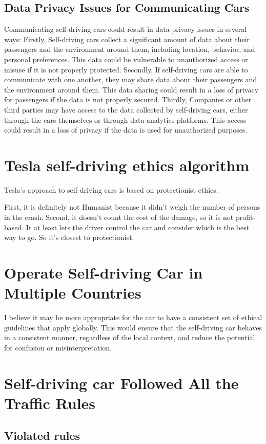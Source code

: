 \documentclass[
	letterpaper, %
]{jdf}
\begin{document}
\subsection{Data Privacy Issues for Communicating Cars }
Communicating self-driving cars could result in data privacy issues in several ways:
Firstly, Self-driving cars collect a significant amount of data about their passengers and the environment around them, including location, behavior, and personal preferences. This data could be vulnerable to unauthorized access or misuse if it is not properly protected.
Secondly, If self-driving cars are able to communicate with one another, they may share data about their passengers and the environment around them. This data sharing could result in a loss of privacy for passengers if the data is not properly secured.
Thirdly,  Companies or other third parties may have access to the data collected by self-driving cars, either through the cars themselves or through data analytics platforms. This access could result in a loss of privacy if the data is used for unauthorized purposes.



\section{Tesla self-driving ethics algorithm}
Tesla's approach to self-driving cars is based on protectionist ethics. 

First, it is definitely not Humanist because it didn't weigh the number of persons in the crash. Second, it doesn't count the cost of the damage, so it is not profit-based. It at least lets the driver control the car and consider which is the best way to go. So it's closest to protectionist. 
\section{Operate Self-driving Car in Multiple Countries}
I believe it may be more appropriate for the car to have a consistent set of ethical guidelines that apply globally. This would ensure that the self-driving car behaves in a consistent manner, regardless of the local context, and reduce the potential for confusion or misinterpretation.
\section{Self-driving car Followed All the Traffic Rules}
\subsection{Violated rules}
\end{document}
